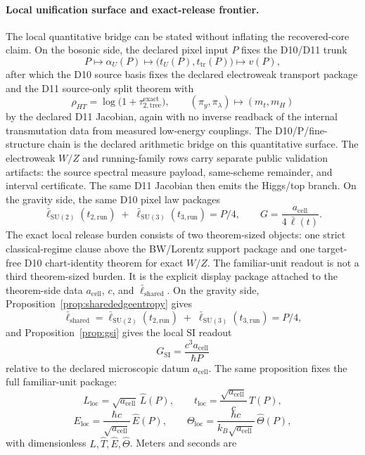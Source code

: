 \documentclass[11pt]{article}
\newcommand{\ellbar}{\bar{\ell}}
\begin{document}
\paragraph{Local unification surface and exact-release frontier.}
The local quantitative bridge can be stated without inflating the recovered-core claim. On the
bosonic side, the declared pixel input \(P\) fixes the D10/D11 trunk
\[
P\longmapsto \alpha_U(P) \longmapsto \bigl(t_U(P),t_{\mathrm{tr}}(P)\bigr)\longmapsto v(P),
\]
after which the D10 source basis fixes the declared electroweak transport package and the D11 source-only split theorem with
\[
\rho_{HT}=\log\!\bigl(1+\tau_{2,\mathrm{tree}}^{\mathrm{exact}}\bigr),
\qquad
(\pi_y,\pi_\lambda)\longmapsto (m_t,m_H)
\]
by the declared D11 Jacobian, again with no inverse readback of the internal transmutation data from measured low-energy couplings. The D10/P/fine-structure chain is the declared arithmetic bridge on this quantitative surface. The electroweak \(W/Z\) and running-family rows carry separate public validation artifacts: the source spectral measure payload, same-scheme remainder, and interval certificate. The same D11 Jacobian then emits the Higgs/top branch. On the gravity side, the same D10 pixel law packages
\[
\ellbar_{\mathrm{SU(2)}}(t_{2,\mathrm{run}})
\;+\;
\ellbar_{\mathrm{SU(3)}}(t_{3,\mathrm{run}})
=
P/4,
\qquad
G=\frac{a_{\mathrm{cell}}}{4\,\ellbar(t)}.
\]
The exact local release burden consists of two theorem-sized objects: one strict
classical-regime clause above the BW/Lorentz support package and one target-free D10
chart-identity theorem for exact \(W/Z\). The familiar-unit readout is not a third theorem-sized
burden. It is the explicit display package attached to the theorem-side data
\(a_{\mathrm{cell}}\), \(c\), and \(\ellbar_{\mathrm{shared}}\). On the gravity side,
Proposition~\ref{prop:sharededgeentropy} gives
\[
\ellbar_{\mathrm{shared}}
=
\ellbar_{\mathrm{SU(2)}}(t_{2,\mathrm{run}})
\;+\;
\ellbar_{\mathrm{SU(3)}}(t_{3,\mathrm{run}})
=
P/4,
\]
and Proposition~\ref{prop:gsi} gives the local SI readout
\[
G_{\mathrm{SI}}=\frac{c^3 a_{\mathrm{cell}}}{\hbar P}
\]
relative to the declared microscopic datum \(a_{\mathrm{cell}}\).
The same proposition fixes the full familiar-unit package:
\[
L_{\mathrm{loc}}=\sqrt{a_{\mathrm{cell}}}\,\widehat L(P),\qquad
t_{\mathrm{loc}}=\frac{\sqrt{a_{\mathrm{cell}}}}{c}\,\widehat T(P),
\]
\[
E_{\mathrm{loc}}=\frac{\hbar c}{\sqrt{a_{\mathrm{cell}}}}\,\widehat E(P),\qquad
\Theta_{\mathrm{loc}}=\frac{\hbar c}{k_B\sqrt{a_{\mathrm{cell}}}}\,\widehat\Theta(P),
\]
with dimensionless \(\widehat L,\widehat T,\widehat E,\widehat\Theta\). Meters and seconds are
\end{document}
